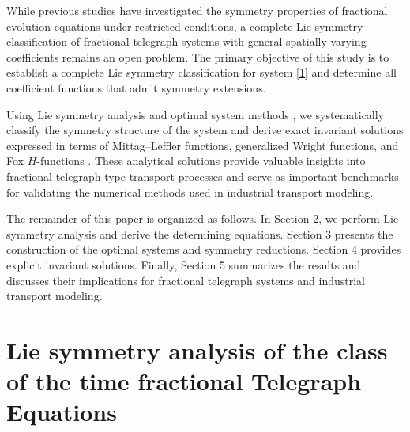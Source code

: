 \documentclass[12pt]{amsart}
\begin{document}
While previous studies have investigated the symmetry properties of fractional evolution equations under restricted conditions, a complete Lie symmetry classification of fractional telegraph systems with general spatially varying coefficients remains an open problem. The primary objective of this study is to establish a complete Lie symmetry classification for system \eqref{1} and determine all coefficient functions that admit symmetry extensions.

Using Lie symmetry analysis and optimal system methods \cite{PateraWinternitz1977}, we systematically classify the symmetry structure of the system and derive exact invariant solutions expressed in terms of Mittag--Leffler functions, generalized Wright functions, and Fox $H$-functions \cite{ourFCAA}. These analytical solutions provide valuable insights into fractional telegraph-type transport processes and serve as important benchmarks for validating the numerical methods used in industrial transport modeling.

The remainder of this paper is organized as follows. In Section 2, we perform Lie symmetry analysis and derive the determining equations. Section 3 presents the construction of the optimal systems and symmetry reductions. Section 4 provides explicit invariant solutions. Finally, Section 5 summarizes the results and discusses their implications for fractional telegraph systems and industrial transport modeling.


\section{Lie symmetry analysis of the class of the
time fractional Telegraph Equations}
\end{document}
